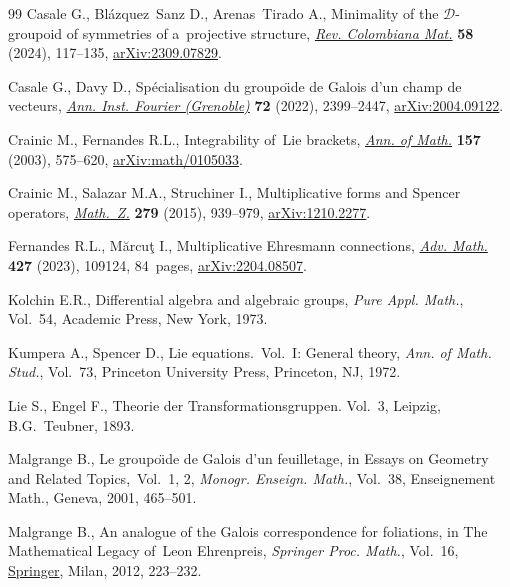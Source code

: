 \documentclass[10pt,a4paper]{amsart}
\numberwithin{equation}{section}
\theoremstyle{definition}
\begin{document}
\begin{thebibliography}{99}
Casale G., Bl\'azquez~Sanz D., Arenas~Tirado A., Minimality of the {$\mathcal
 D$}-groupoid of symmetries of a~projective structure,
 \href{https://doi.org/10.15446/recolma.v58n2.121031}{\textit{Rev. Colombiana
 Mat.}} \textbf{58} (2024), 117--135,
 \href{https://arxiv.org/abs/2309.07829}{arXiv:2309.07829}.

Casale G., Davy D., Sp\'ecialisation du groupo\"{\i}de de {G}alois d'un champ
 de vecteurs, \href{https://doi.org/10.5802/aif.3506}{\textit{Ann. Inst.
 Fourier (Grenoble)}} \textbf{72} (2022), 2399--2447,
 \href{https://arxiv.org/abs/2004.09122}{arXiv:2004.09122}.

Crainic M., Fernandes R.L., Integrability of~{L}ie brackets,
 \href{https://doi.org/10.4007/annals.2003.157.575}{\textit{Ann. of Math.}}
 \textbf{157} (2003), 575--620,
 \href{https://arxiv.org/abs/math/0105033}{arXiv:math/0105033}.

Crainic M., Salazar M.A., Struchiner I., Multiplicative forms and {S}pencer
 operators,
 \href{https://doi.org/10.1007/s00209-014-1398-z}{\textit{Math.~Z.}}
 \textbf{279} (2015), 939--979,
 \href{https://arxiv.org/abs/1210.2277}{arXiv:1210.2277}.

Fernandes R.L., M\u{a}rcu\c{t} I., Multiplicative {E}hresmann connections,
 \href{https://doi.org/10.1016/j.aim.2023.109124}{\textit{Adv. Math.}}
 \textbf{427} (2023), 109124, 84~pages,
 \href{https://arxiv.org/abs/2204.08507}{arXiv:2204.08507}.

Kolchin E.R., Differential algebra and algebraic groups, \textit{Pure Appl.
 Math.}, Vol.~54, Academic Press, New York, 1973.

Kumpera A., Spencer D., Lie equations.~{V}ol.~{I}: {G}eneral theory,
 \textit{Ann. of Math. Stud.}, Vol.~73, Princeton University Press, Princeton,
 NJ, 1972.

Lie S., Engel F., Theorie der {T}ransformationsgruppen. Vol.~3, Leipzig,
 B.G.~Teubner, 1893.

Malgrange B., Le groupo\"{\i}de de {G}alois d'un feuilletage, in Essays on
 {G}eometry and {R}elated {T}opics,~{V}ol.~1, 2, \textit{Monogr. Enseign.
 Math.}, Vol.~38, Enseignement Math., Geneva, 2001, 465--501.

Malgrange B., An analogue of the {G}alois correspondence for foliations, in The
 {M}athematical {L}egacy of~{L}eon {E}hrenpreis, \textit{Springer Proc.
 Math.}, Vol.~16,
 \href{https://doi.org/10.1007/978-88-470-1947-8_14}{Springer}, Milan, 2012,
 223--232.


\end{thebibliography}
\end{document}
